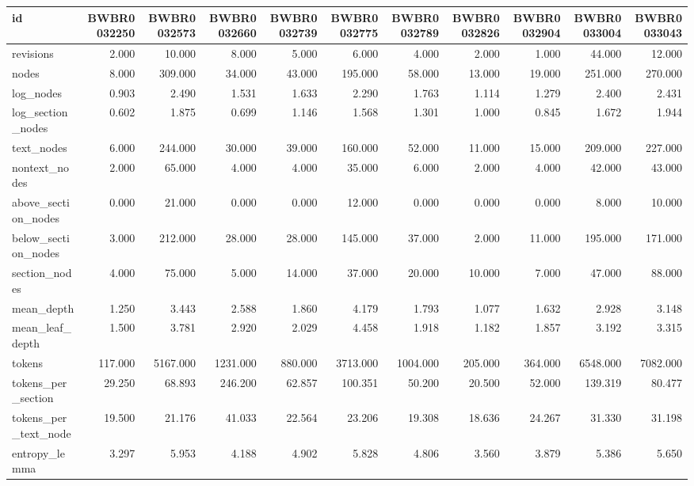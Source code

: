 \begin{tabular}{lrrrrrrrrrr}
\toprule
id & BWBR0032250 & BWBR0032573 & BWBR0032660 & BWBR0032739 & BWBR0032775 & BWBR0032789 & BWBR0032826 & BWBR0032904 & BWBR0033004 & BWBR0033043 \\
\midrule
revisions & 2.000 & 10.000 & 8.000 & 5.000 & 6.000 & 4.000 & 2.000 & 1.000 & 44.000 & 12.000 \\
\cline{1-11}
nodes & 8.000 & 309.000 & 34.000 & 43.000 & 195.000 & 58.000 & 13.000 & 19.000 & 251.000 & 270.000 \\
\cline{1-11}
log\_nodes & 0.903 & 2.490 & 1.531 & 1.633 & 2.290 & 1.763 & 1.114 & 1.279 & 2.400 & 2.431 \\
\cline{1-11}
log\_section\_nodes & 0.602 & 1.875 & 0.699 & 1.146 & 1.568 & 1.301 & 1.000 & 0.845 & 1.672 & 1.944 \\
\cline{1-11}
text\_nodes & 6.000 & 244.000 & 30.000 & 39.000 & 160.000 & 52.000 & 11.000 & 15.000 & 209.000 & 227.000 \\
\cline{1-11}
nontext\_nodes & 2.000 & 65.000 & 4.000 & 4.000 & 35.000 & 6.000 & 2.000 & 4.000 & 42.000 & 43.000 \\
\cline{1-11}
above\_section\_nodes & 0.000 & 21.000 & 0.000 & 0.000 & 12.000 & 0.000 & 0.000 & 0.000 & 8.000 & 10.000 \\
\cline{1-11}
below\_section\_nodes & 3.000 & 212.000 & 28.000 & 28.000 & 145.000 & 37.000 & 2.000 & 11.000 & 195.000 & 171.000 \\
\cline{1-11}
section\_nodes & 4.000 & 75.000 & 5.000 & 14.000 & 37.000 & 20.000 & 10.000 & 7.000 & 47.000 & 88.000 \\
\cline{1-11}
mean\_depth & 1.250 & 3.443 & 2.588 & 1.860 & 4.179 & 1.793 & 1.077 & 1.632 & 2.928 & 3.148 \\
\cline{1-11}
mean\_leaf\_depth & 1.500 & 3.781 & 2.920 & 2.029 & 4.458 & 1.918 & 1.182 & 1.857 & 3.192 & 3.315 \\
\cline{1-11}
tokens & 117.000 & 5167.000 & 1231.000 & 880.000 & 3713.000 & 1004.000 & 205.000 & 364.000 & 6548.000 & 7082.000 \\
\cline{1-11}
tokens\_per\_section & 29.250 & 68.893 & 246.200 & 62.857 & 100.351 & 50.200 & 20.500 & 52.000 & 139.319 & 80.477 \\
\cline{1-11}
tokens\_per\_text\_node & 19.500 & 21.176 & 41.033 & 22.564 & 23.206 & 19.308 & 18.636 & 24.267 & 31.330 & 31.198 \\
\cline{1-11}
entropy\_lemma & 3.297 & 5.953 & 4.188 & 4.902 & 5.828 & 4.806 & 3.560 & 3.879 & 5.386 & 5.650 \\

\end{tabular}
